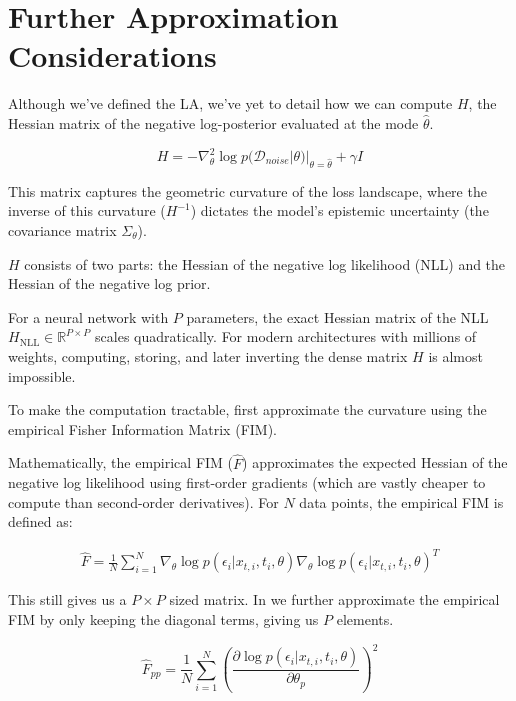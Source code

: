 \section{Further Approximation Considerations}
\label{sec:bg_gu_further_approx}

Although we've defined the \acs{LA}, we've yet to detail how we can compute $H$, the Hessian matrix of the negative log-posterior evaluated at the mode $\hat\theta$.

\begin{equation}
    H = -\nabla_\theta^2 \log p(\mathcal{D}_{noise}|\theta)|_{\theta=\hat\theta} + \gamma I
\end{equation}

This matrix captures the geometric curvature of the loss landscape, where the inverse of this curvature ($H^{-1}$) dictates the model's epistemic uncertainty (the covariance matrix $\Sigma_{\theta}$).  

$H$ consists of two parts: the Hessian of the negative log likelihood (\acs{NLL}) and the Hessian of the negative log prior. 

For a neural network with $P$ parameters, the exact Hessian matrix of the \acs{NLL} $H_{\mathrm{NLL}}\in \mathbb{R}^{P \times P}$ scales quadratically. For modern architectures with millions of weights, computing, storing, and later inverting the dense matrix $H$ is almost impossible.

To make the computation tractable, \cite{jazbec_generative_2025} first approximate the curvature using the empirical Fisher Information Matrix (\acs{FIM}).

Mathematically, the empirical \acs{FIM} ($\hat{F}$) approximates the expected Hessian of the negative log likelihood using first-order gradients (which are vastly cheaper to compute than second-order derivatives). For $N$ data points, the empirical FIM is defined as:

\begin{align}
\hat{F} = \frac{1}{N} \sum_{i=1}^N \nabla_{\theta} \log p(\epsilon_i|x_{t,i}, t_i,\theta) \nabla_{\theta} \log p(\epsilon_i|x_{t,i}, t_i,\theta)^T 
\end{align}

This still gives us a $P\times P$ sized matrix. In \cite{jazbec_generative_2025} we further approximate the empirical \acs{FIM} by only keeping the diagonal terms, giving us $P$ elements.

\begin{equation}
\hat{F}_{pp} = \frac{1}{N} \sum_{i=1}^N \left( \frac{\partial \log p(\epsilon_i|x_{t,i},t_i, \theta)}{\partial \theta_p} \right)^2
\end{equation}

